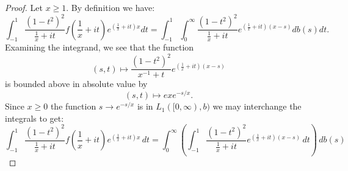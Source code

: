     \begin{proof} 
        Let $x \geq 1$. By definition we have:
        \begin{equation*}
            \int_{-1}^1\frac{(1-t^2)^2}{\frac1x+it}f(\frac1x+it)e^{(\frac1x+it)x}dt = \int_{-1}^1\int_0^{\infty}\frac{(1-t^2)^2}{\frac1x+it}e^{(\frac1x+it)(x-s)}db(s)dt.
        \end{equation*}
        Examining the integrand, we see that the function
        \begin{equation*}
            (s,t) \mapsto \frac{(1-t^2)^2}{x^{-1}+t}e^{(\frac{1}{x}+it)(x-s)}
        \end{equation*}
        is bounded above in absolute value by
        \begin{equation*}
            (s,t)\mapsto exe^{-s/x}.
        \end{equation*}
        Since $x \geq 0$ the function $s\to e^{-s/x}$ is in $L_1([0,\infty),b)$ we may interchange the integrals to get:
        \begin{equation*}
            \int_{-1}^1 \frac{(1-t^2)^2}{\frac{1}{x}+it}f(\frac{1}{x}+it)e^{(\frac{1}{x}+it)x}\,dt = \int_0^\infty \left(\int_{-1}^1 \frac{(1-t^2)^2}{\frac{1}{x}+it}e^{(\frac{1}{x}+it)(x-s)}\,dt\right)\,db(s)
        \end{equation*}
        

\end{proof}
